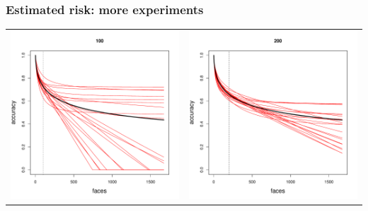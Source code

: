 \documentclass{beamer}
\begin{document}
\begin{frame}
\frametitle{Estimated risk: more experiments}
\begin{center}
\begin{tabular}{cc}
\includegraphics[scale = 0.2]{../facerec/sub_100.pdf} &
\includegraphics[scale = 0.2]{../facerec/sub_200.pdf} \\

\end{tabular}
\end{center}
\end{frame}
\end{document}
